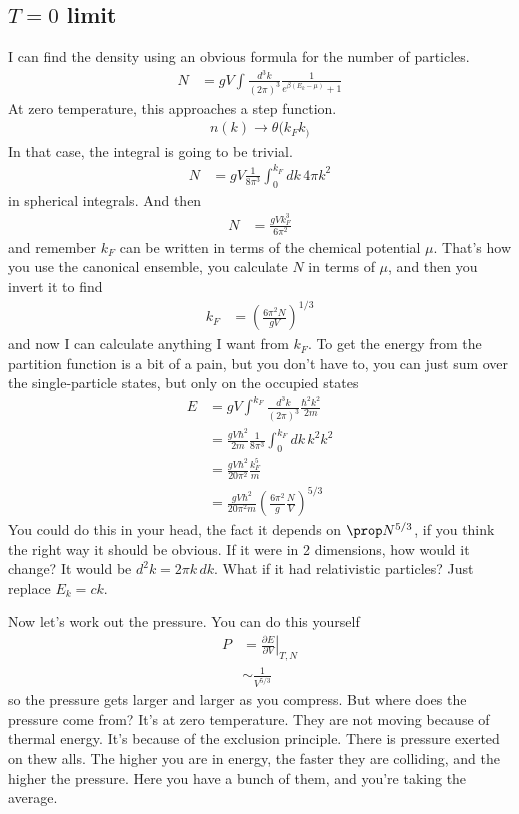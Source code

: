 \subsection{$T=0$ limit}
I can find the density using an obvious formula for the number of particles.
\begin{align}
    N &=
    gV \int \frac{d^{3}k}{\left( 2\pi \right)^3}
    \frac{1}{e^{\beta\left( E_k - \mu \right)} + 1}
\end{align}
At zero temperature,
this approaches a step function.
\begin{align}
    n(k) \to \theta(k_F k _)
\end{align}
In that case,
the integral is going to be trivial.
\begin{align}
    N &=
    gV \frac{1}{8\pi^3}
    \int_{0}^{k_F} dk\, 4\pi k^2
\end{align}
in spherical integrals.
And then
\begin{align}
    N &= \frac{gV k_F^3}{6\pi^2}
\end{align}
and remember $k_F$ can be written in terms of the chemical potential $\mu$.
That's how you use the canonical ensemble,
you calculate $N$ in terms of $\mu$,
and then you invert it to find
\begin{align}
    k_F &= \left( \frac{6\pi^2 N}{g V} \right)^{1/3}
\end{align}
and now I can calculate anything I want from $k_F$.
To get the energy from the partition function is a bit of a pain,
but you don't have to,
you can just sum over the single-particle states,
but only on the occupied states
\begin{align}
    E &=
    gV \int^{k_F} \frac{d^3k}{\left( 2\pi \right)^3}
    \frac{\hbar^2 k^2}{2m}\\
    &=
    \frac{gV \hbar^2}{2m}
    \frac{1}{8\pi^3}
    \int_{0}^{k_F} dk\, k^2 k^2\\
    &=
    \frac{gV\hbar^2}{20\pi^2} \frac{k_F^5}{m}\\
    &=
    \frac{gV \hbar^2}{20\pi^2 m}
    \left( \frac{6\pi^2}{g} \frac{N}{V} \right)^{5/3}
\end{align}
You could do this in your head,
the fact it depends on $\prop N^{5/3}$,
if you think the right way it should be obvious.
If it were in 2 dimensions,
how would it change?
It would be $d^2k = 2\pi k\,dk$.
What if it had relativistic particles?
Just replace $E_k = ck$.

Now let's work out the pressure. 
You can do this yourself
\begin{align}
    P &=
    \left.\frac{\partial E}{\partial V}\right|_{T,N}\\
    &\sim
    \frac{1}{V^{5/3}}
\end{align}
so the pressure gets larger and larger as you compress.
But where does the pressure come from?
It's at zero temperature.
They are not moving because of thermal energy.
It's because of the exclusion principle.
There is  pressure exerted on thew alls.
The higher you are in energy,
the faster they are colliding,
and the higher the pressure.
Here you have a bunch of them,
and you're taking the average.

